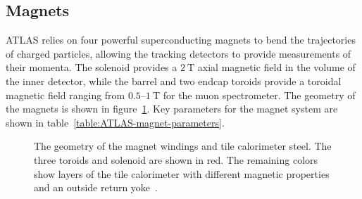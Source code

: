 \subsection{Magnets}\label{sec:ATLAS-magnets}
ATLAS relies on four powerful superconducting magnets to bend the trajectories of charged particles, allowing the tracking detectors to provide measurements of their momenta. The solenoid provides a $\SI{2}{\tesla}$ axial magnetic field in the volume of the inner detector, while the barrel and two endcap toroids provide a toroidal magnetic field ranging from $0.5$--$\SI{1}{\tesla}$ for the muon spectrometer. The geometry of the magnets is shown in figure~\ref{fig:ATLAS-magnets-sketch}. Key parameters for the magnet system are shown in table~\ref{table:ATLAS-magnet-parameters}.

\begin{figure}[htbp]
	\centering
	\caption{The geometry of the magnet windings and tile calorimeter steel. The three toroids and solenoid are shown in red. The remaining colors show layers of the tile calorimeter with different magnetic properties and an outside return yoke~\cite{atlasphotos}.}
	\label{fig:ATLAS-magnets-sketch}
\end{figure}


